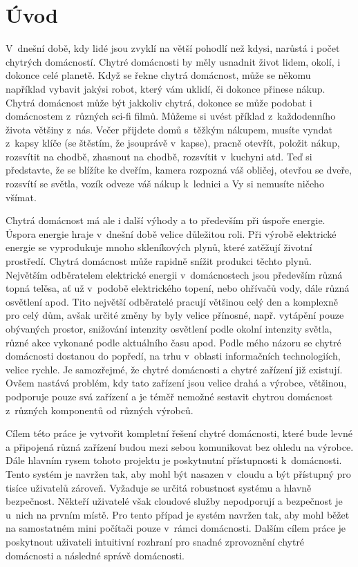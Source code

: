 \chapter{Úvod}

V~dnešní době, kdy lidé jsou zvyklí na větší pohodlí než kdysi, narůstá i počet chytrých domácností.
Chytré domácnosti by měly usnadnit život lidem, okolí, i dokonce celé planetě.
Když se řekne chytrá domácnost, může se někomu například vybavit jakýsi robot, který vám uklidí, či dokonce přinese nákup.
Chytrá domácnost může být jakkoliv chytrá, dokonce se může podobat i domácnostem z~různých sci-fi filmů.
Můžeme si uvést příklad z~každodenního života většiny z~nás.
Večer přijdete domů s~těžkým nákupem, musíte vyndat z~kapsy klíče (se štěstím, že jsouprávě v~kapse), pracně otevřít, položit nákup, rozsvítit na chodbě, zhasnout na chodbě,
rozsvítit v~kuchyni atd.
Teď si představte, že se blížíte ke dveřím, kamera rozpozná váš obličej, otevřou se dveře, rozsvítí se světla, vozík odveze váš nákup k~lednici a Vy si nemusíte ničeho všímat.

Chytrá domácnost má ale i další výhody a to především při úspoře energie.
Úspora energie hraje v~dnešní době velice důležitou roli.
Při výrobě elektrické energie se vyprodukuje mnoho skleníkových plynů, které zatěžují životní prostředí.
Chytrá domácnost může rapidně snížit produkci těchto plynů.
Největším odběratelem elektrické energii v~domácnostech jsou především různá topná telěsa, ať už v~podobě elektrického topení, nebo ohřívačů vody, dále různá osvětlení apod.
Tito největší odběratelé pracují většinou celý den a komplexně pro celý dům, avšak určité změny by byly velice přínosné, např. vytápění pouze obývaných prostor,
snižování intenzity osvětlení podle okolní intenzity světla, různé akce vykonané podle aktuálního času apod.
Podle mého názoru se chytré domácnosti dostanou do popředí, na trhu v~oblasti informačních technologiích, velice rychle.
Je samozřejmé, že chytré domácnosti a chytré zařízení již existují.
Ovšem nastává problém, kdy tato zařízení jsou velice drahá a výrobce, většinou, podporuje pouze svá zařízení a je téměř nemožné sestavit chytrou domácnost z~různých komponentů od různých výrobců.

Cílem této práce je vytvořit kompletní řešení chytré domácnosti, které bude levné a připojená různá zařízení budou mezi sebou komunikovat bez ohledu na výrobce.
Dále hlavním rysem tohoto projektu je poskytnutní přístupnosti k~domácnosti. Tento systém je navržen tak, aby mohl být nasazen v~cloudu a být přístupný pro tisíce uživatelů zároveň. Vyžaduje se určitá robustnost systému a hlavně bezpečnost.
Někteří uživatelé však cloudové služby nepodporují a bezpečnost je u~nich na prvním místě. Pro tento případ je systém navržen tak, aby mohl běžet na samostatném mini počítači pouze v~rámci domácnosti. Dalším cílem práce je poskytnout uživateli
intuitivní rozhraní pro snadné zprovoznění chytré domácnosti a následné správě domácnosti.

